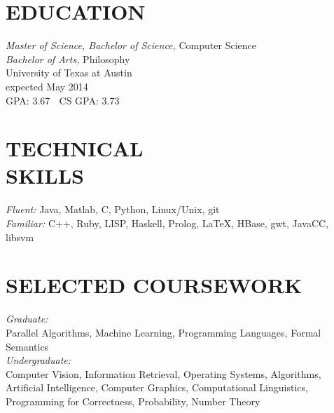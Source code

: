 \documentclass[line,margin]{res}
\begin{document}
\address{\textbf{email:} tomas.mccandless@gmail.com, \textbf{phone:} (210) 232-1477} 
\address{\textbf{web:} tomasmccandless.com}

 
\begin{resume}
 
 
\section{EDUCATION} {\sl Master of Science, Bachelor of Science,} Computer Science \\
										{\sl Bachelor of Arts,} Philosophy \\
                University of Texas at Austin\\
								expected May 2014 \\
								GPA: 3.67  $\;$ CS GPA: 3.73 
 
\section{TECHNICAL \\ SKILLS} {\sl Fluent:} Java, Matlab, C, Python, Linux/Unix, git \\
                {\sl Familiar:} C++, Ruby, LISP, Haskell, Prolog, \LaTeX, HBase, gwt, JavaCC, libsvm \\

\section{SELECTED COURSEWORK} {\sl Graduate:} \\ Parallel Algorithms, Machine Learning, Programming Languages, Formal Semantics \\
															{\sl Undergraduate:} \\ Computer Vision, Information Retrieval, Operating Systems, Algorithms, 
															Artificial Intelligence, Computer Graphics, Computational Linguistics, Programming for Correctness, 
															Probability, Number Theory


\end{resume}
\end{document}
